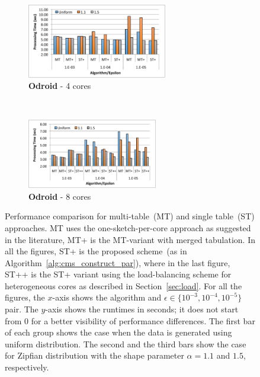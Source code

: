 \documentclass[runningheads]{llncs}
\begin{document}
\begin{figure}[htbp]
    \begin{subfigure}[b]{0.47\textwidth}
        \centering
        \includegraphics[width = 6.1cm]{figs/main_3_4.pdf}
        \caption{{\bf Odroid} - 4 cores}
    \end{subfigure}\hspace*{1ex}
    ~
    \begin{subfigure}[b]{0.47\textwidth}
        \centering
        \includegraphics[width = 5.7cm]{figs/main_3_8.pdf}
        \caption{{\bf Odroid} - 8 cores}
    \end{subfigure}
     \renewcommand{\baselinestretch}{0.93}
    \caption{\small{Performance comparison for multi-table~(MT) and single table~(ST) approaches. MT uses the one-sketch-per-core approach as suggested in the literature, MT+ is the MT-variant with merged tabulation. In all the figures, ST+ is the proposed scheme~(as in Algorithm~\ref{alg:cms_construct_par}), where in the last figure, ST++ is the ST+ variant using the  load-balancing scheme for heterogeneous cores as described in Section~\ref{sec:load}. For all the figures, the $x$-axis shows the algorithm and $\epsilon \in \{10^{-3}, 10^{-4}, 10^{-5}\}$ pair. The $y$-axis shows the runtimes in seconds; it does not start from 0 for a better visibility of performance differences. The first bar of each group shows the case when the data is generated using uniform distribution. The second and the third bars show the case for Zipfian distribution with the shape parameter $\alpha = 1.1$ and $1.5$, respectively.}}
     \renewcommand{\baselinestretch}{1}

    \label{fig:main}
\end{figure}
\end{document}
